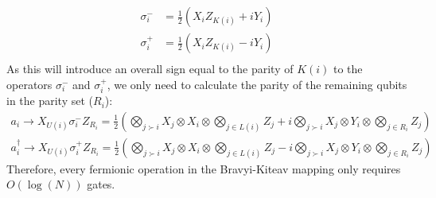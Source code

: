 \documentclass[twoside]{article}
\begin{document}
\begin{itemlist}
        \begin{equation}
                \begin{align}
                        \sigma^-_i &= \frac{1}{2}(X_i Z_{K(i)} + i Y_i) \\
                        \sigma^+_i &= \frac{1}{2}(X_i Z_{K(i)} - i Y_i) \\
                \end{align}
        \end{equation}
        As this will introduce an overall sign equal to the parity of $K(i)$ to the operators  $\sigma^-_i$ and $\sigma^+_i$, we only need to calculate the parity of the remaining qubits in the parity set ($R_i$):
        \begin{equation}
                \begin{align}
                a_i \rightarrow X_{U(i)}  \sigma^-_i  Z_{R_i} = \frac{1}{2}\left( \bigotimes_{j \succ i} X_j \otimes X_i \otimes \bigotimes_{j \in L(i)} Z_j + i \bigotimes_{j \succ i} X_j \otimes Y_i\otimes \bigotimes_{j \in R_i} Z_j \right) \\
                a^{\dagger}_i \rightarrow X_{U(i)}  \sigma^+_iZ_{R_i} = \frac{1}{2}\left( \bigotimes_{j \succ i} X_j \otimes X_i \otimes \bigotimes_{j \in L(i)} Z_j - i \bigotimes_{j \succ i} X_j \otimes Y_i\otimes \bigotimes_{j \in R_i} Z_j \right) 
                \end{align}
        \end{equation}
        Therefore, every fermionic operation in the Bravyi-Kiteav mapping only requires $O(\log(N))$ gates.
\end{itemlist}
\end{document}
